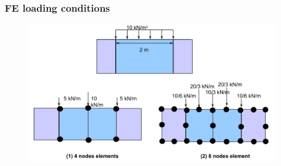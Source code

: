 \documentclass[notes]{beamer}
\begin{document}
\begin{frame}
\frametitle{FE loading conditions}
\begin{figure}[ht]
	\centering
	\includegraphics[width=\textwidth]{figs/load-distribution.png}
\end{figure}
\end{frame}
\end{document}
